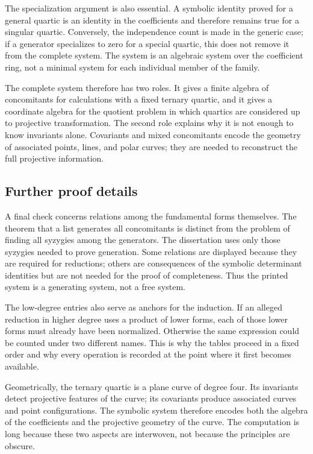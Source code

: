 \documentclass[12pt]{article}
\begin{document}
The specialization argument is also essential. A symbolic identity proved for a general quartic is
an identity in the coefficients and therefore remains true for a singular quartic. Conversely, the
independence count is made in the generic case; if a generator specializes to zero for a special
quartic, this does not remove it from the complete system. The system is an algebraic system over
the coefficient ring, not a minimal system for each individual member of the family.

The complete system therefore has two roles. It gives a finite algebra of concomitants for
calculations with a fixed ternary quartic, and it gives a coordinate algebra for the quotient
problem in which quartics are considered up to projective transformation. The second role explains
why it is not enough to know invariants alone. Covariants and mixed concomitants encode the geometry
of associated points, lines, and polar curves; they are needed to reconstruct the full projective
information.


\subsection{Further proof details}

A final check concerns relations among the fundamental forms themselves. The theorem that a list
generates all concomitants is distinct from the problem of finding all syzygies among the
generators. The dissertation uses only those syzygies needed to prove generation. Some relations are
displayed because they are required for reductions; others are consequences of the symbolic
determinant identities but are not needed for the proof of completeness. Thus the printed system is
a generating system, not a free system.

The low-degree entries also serve as anchors for the induction. If an alleged reduction in higher
degree uses a product of lower forms, each of those lower forms must already have been normalized.
Otherwise the same expression could be counted under two different names. This is why the tables
proceed in a fixed order and why every operation is recorded at the point where it first becomes
available.

Geometrically, the ternary quartic is a plane curve of degree four. Its invariants detect projective
features of the curve; its covariants produce associated curves and point configurations. The
symbolic system therefore encodes both the algebra of the coefficients and the projective geometry
of the curve. The computation is long because these two aspects are interwoven, not because the
principles are obscure.
\end{document}
